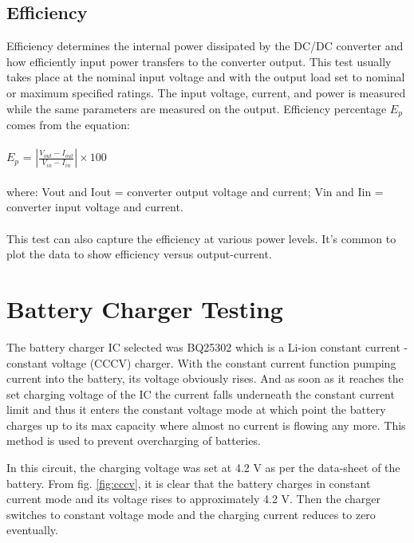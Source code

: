 \subsection{Efficiency} 

Efficiency determines the internal power dissipated by the DC/DC converter and how efficiently input power transfers to the converter output. This test usually takes place at the nominal input voltage and with the output load set to nominal or maximum specified ratings. The input voltage, current, and power is measured while the same parameters are measured on the output. Efficiency percentage $E_{p}$ comes from the equation:
\\ \\
\hspace*{5cm}$E_{p}$ = $\left | \frac{V_{out}-I_{out}}{V_{in}-I_{in}} \right | \times 100$
\\ \\
where:
Vout and Iout = converter output voltage and current;
Vin and Iin = converter input voltage and current.
\\ \\
This test can also capture the efficiency at various power levels. It’s common to plot the data to show efficiency versus output-current.

\section{Battery Charger Testing}
 The battery charger IC selected was BQ25302 which is a Li-ion constant current - constant voltage (CCCV) charger. With the constant current function pumping current into the battery, its voltage obviously rises. And as soon as it reaches the set charging voltage of the IC the current
falls underneath the constant current limit and thus it enters the constant voltage mode at which point the battery charges up to its max capacity where almost no current is flowing any more. This method is used to prevent overcharging of batteries.

In this circuit, the charging voltage was set at 4.2 V as per the data-sheet of the battery. From fig. \ref{fig:cccv}, it is clear that the battery charges in constant current mode and its voltage rises to approximately 4.2 V. Then the charger switches to constant voltage mode and the charging current reduces to zero eventually.

